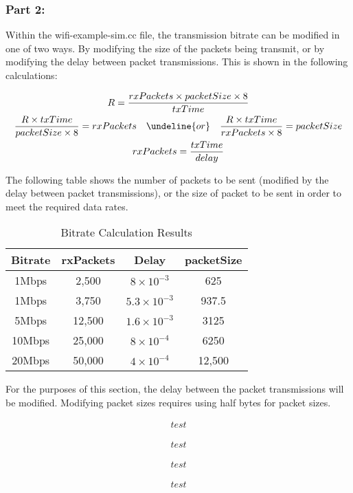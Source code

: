 \subsubsection{Part 2:}

Within the wifi-example-sim.cc file, the transmission bitrate can be modified in
one of two ways. By modifying the size of the packets being transmit, or by
modifying the delay between packet transmissions. This is shown in the following
calculations:

\begin{gather*}
	R=\frac{rxPackets\times packetSize \times 8}{txTime} \\
	\begin{align*}
		\frac{R\times txTime}{packetSize \times 8} &= rxPackets &
		\undeline{or}& & \frac{R \times txTime}{rxPackets
	\times 8} &= packetSize \\
	\end{align*} \\
	rxPackets=\frac{txTime}{delay}
\end{gather*}

The following table shows the number of packets to be sent (modified by the
delay between packet transmissions), or the size of packet to be sent in order
to meet the required data rates.

\begin{table}[H]
	\centering
	\caption{Bitrate Calculation Results}
	\label{tab:brcalc}
	\begin{tabular}{|c|c|c|c|}
	\hline
	Bitrate & rxPackets & Delay & packetSize \\
	\hline
	1Mbps & 2,500 & $8\times 10^{-3}$ & 625 \\
	1Mbps & 3,750 & $5.3\times 10^{-3}$ & 937.5 \\
	5Mbps & 12,500 & $1.6\times 10^{-3}$ & 3125 \\
	10Mbps & 25,000 & $8\times 10^{-4}$ & 6250 \\
	20Mbps & 50,000 & $4\times 10^{-4}$ & 12,500 \\
	\hline
	\end{tabular}
\end{table}

For the purposes of this section, the delay between the packet transmissions
will be modified. Modifying packet sizes requires using half bytes for packet
sizes.

\begin{gather*}
	test
\end{gather*}

\begin{gather*}
test
\end{gather*}

\begin{gather*}
test
\end{gather*}

\begin{gather*}
test
\end{gather*}
